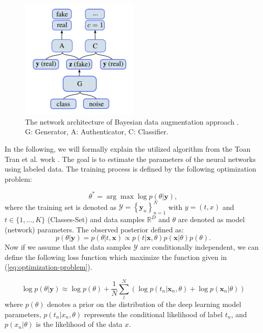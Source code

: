 \begin{figure}
  \centering
  \label{fig:bayesian-approach-gan-architecture}
  \includegraphics[width=0.5\textwidth]{fig/bayesian-approach-gan-architecture}
  \caption{The network architecture of Bayesian data augmentation approach \cite{refrence_bayesian_approach}. G: Generator, A: Authenticator, C: Classifier.}
\end{figure}

In the following, we will formally explain the utilized algorithm from the Toan Tran et al. work \cite{refrence_bayesian_approach}. The goal is to estimate the parameters of the neural networks using labeled data. The training process is defined by the following optimization problem:

\begin{equation} \label{eq:optimization-problem}
  \theta^{*}=\arg \max \log p(\theta | \mathbf{y}),
\end{equation}
where the training set is denoted as $\mathcal{Y}=\left\{\mathbf{y}_{n}\right\}_{n=1}^{N}$ with $y=(t,x)$
and $t\in\{1, ..., K\}$ (Classes-Set) and data samples $\mathbb{R}^D$ and $\theta$ are denoted as
model (network) parameters. The observed posterior defined as:
\begin{equation} \label{eq:observed-posterior}
  p(\theta | \mathbf{y})=p(\theta | t, \mathbf{x}) \propto p(t | \mathbf{x}, \theta) p(\mathbf{x} | \theta) p(\theta).
\end{equation}
Now if we assume that the data samples $\mathcal{Y}$ are conditionally independent, we can define the
following loss function which maximize the function given in (\ref{eq:optimization-problem}).

\begin{equation} \label{eq:loss-function}
  \log p(\theta | \mathbf{y}) \approx \log p(\theta)+\frac{1}{N} \sum_{l}^{N}\left(\log p\left(t_{n} | \mathbf{x}_{n}, \theta\right)+\log p\left(\mathbf{x}_{n} | \theta\right)\right)
\end{equation}
where $p(\theta)$ denotes a prior on the distribution of the deep learning model parameters, $p(t_n|x_n, \theta)$
represents the conditional likelihood of label $t_n$, and $p(x_n|\theta)$ is the likelihood of the
data $x$.

